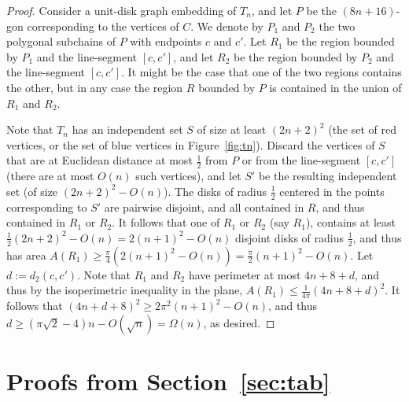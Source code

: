 \documentclass[a4paper,reqno, 12pt]{amsart}
\begin{document}
\begin{proof}
Consider a unit-disk graph embedding of $T_n$, and let $P$ be the
$(8n+16)$-gon corresponding to the vertices of $C$. We denote by $P_1$
and $P_2$ the two polygonal subchains of $P$ with endpoints $c$ and
$c'$.  Let $R_1$ be the
region bounded by $P_1$ and the line-segment $[c,c']$, and let
$R_2$ be the
region bounded by $P_2$ and the line-segment $[c,c']$. It might be
the case that one of the two regions contains the other, but in any case
the region $R$ bounded by $P$ is contained in the union of $R_1$ and
$R_2$.

Note that $T_n$ has an independent set $S$ of size at least
$(2n+2)^2$ (the set of red vertices, or the set of blue vertices in
Figure~\ref{fig:tn}). Discard the vertices of $S$ that are at
Euclidean distance at most
$\tfrac12$ from $P$ or from the line-segment $[c,c']$ (there are at
most $O(n)$ such vertices), and let $S'$ be the resulting independent
set (of size $(2n+2)^2-O(n)$). The disks of radius $\tfrac12$ centered
in the points corresponding to
$S'$ are pairwise disjoint, and all contained in $R$, and thus
contained in $R_1$ or $R_2$. It follows that one of $R_1$ or $R_2$
(say $R_1$), contains at least $\tfrac12 (2n+2)^2-O(n)=2(n+1)^2-O(n)$ disjoint disks of radius
$\tfrac12$, and thus has area $A(R_1)\ge
\tfrac{\pi}{4}(2(n+1)^2-O(n))=\tfrac{\pi}{2}(n+1)^2-O(n)$. Let $d:=d_2(c,c')$. Note that $R_1$ and
$R_2$ have perimeter at most $4n+8+d$, and thus by the isoperimetric
inequality in the plane, $A(R_1)\le \tfrac1{4\pi}(4n+8+d)^2$. It follows
that $(4n+d+8)^2\ge 2\pi^2 (n+1)^2-O(n)$, and thus $d\ge (\pi\sqrt{2}-4) n-O(\sqrt{n})=\Omega(n)$, as desired.
\end{proof}

\section{Proofs from Section~\ref{sec:tab}}
\label{sec:prtab}
  
\lemmidtri*
\end{document}

